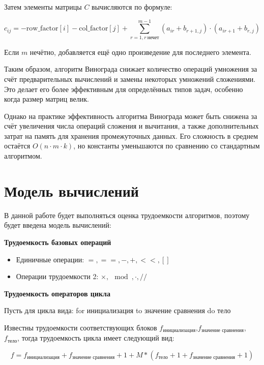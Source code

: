 Затем элементы матрицы \( C \) вычисляются по формуле:

\begin{equation}
    \label{eq:vin3}
    c_{ij} = -\text{row\_factor}[i] - \text{col\_factor}[j] + \sum_{r=1, r\ \text{нечет}}^{m-1} (a_{ir} + b_{r+1,j}) \cdot (a_{ir+1} + b_{r,j})
\end{equation}

Если \( m \) нечётно, добавляется ещё одно произведение для последнего элемента.

Таким образом, алгоритм Винограда снижает количество операций умножения за счёт предварительных вычислений и замены некоторых умножений сложениями. Это делает его более эффективным для определённых типов задач, особенно когда размер матриц велик.

Однако на практике эффективность алгоритма Винограда может быть снижена за счёт увеличения числа операций сложения и вычитания, а также дополнительных затрат на память для хранения промежуточных данных. Его сложность в среднем остаётся \( O(n \cdot m \cdot k) \), но константы уменьшаются по сравнению со стандартным алгоритмом.\cite{vin}

\section{Модель вычислений}

В данной работе будет выполняться оценка трудоемкости алгоритмов, поэтому будет введена модель вычислений:

\textbf{Трудоемкость базовых операций}

\begin{itemize}
    \item Единичные операции: $=, ==, -, +, <<, []$
    \item Операции трудоемкости 2: $\times, \mod, \cdot, //$
\end{itemize}

\textbf{Трудоемкость операторов цикла}

Пусть для цикла вида:
for инициализация to значение сравнения do тело
    
Известны трудоемкости соответствующих блоков $f_{\text{инициализация}}$,\newline$f_{\text{значение сравнения}}$, $f_{\text{тело}}$, тогда трудоемкость цикла имеет следующий вид:

\begin{equation}
    \label{eq:work1}
    f = f_{\text{инициализация}} + f_{\text{значение сравнения}} + 1 + M*(f_{\text{тело}} + 1 + f_{\text{значение сравнения}} + 1)
\end{equation}

